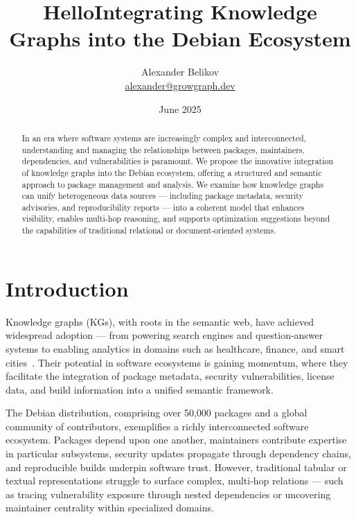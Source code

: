 \documentclass[11pt,oneside,a4paper]{article}
\title{Hello}
\title{Integrating Knowledge Graphs into the Debian Ecosystem}
\author{Alexander Belikov \\ \href{mailto:alexander@growgraph.dev}{alexander@growgraph.dev}}
\date{June 2025}
\begin{document}
    \maketitle

    \begin{abstract}
        In an era where software systems are increasingly complex and interconnected, understanding and managing the relationships between packages, maintainers, dependencies, and vulnerabilities is paramount.
        We propose the innovative integration of knowledge graphs into the Debian ecosystem, offering a structured and semantic approach to package management and analysis.
        We examine how knowledge graphs can unify heterogeneous data sources — including package metadata, security advisories, and reproducibility reports — into a coherent model that enhances visibility, enables multi-hop reasoning, and supports optimization suggestions beyond the capabilities of traditional relational or document‑oriented systems.

    \end{abstract}


    \section{Introduction}
    Knowledge graphs (KGs), with roots in the semantic web, have achieved widespread adoption — from powering search engines and question‑answer systems to enabling analytics in domains such as healthcare, finance, and smart cities~\cite{Iliadis2023-cm}.
    Their potential in software ecosystems is gaining momentum, where they facilitate the integration of package metadata, security vulnerabilities, license data, and build information into a unified semantic framework.

    The Debian distribution, comprising over 50,000 packages and a global community of contributors, exemplifies a richly interconnected software ecosystem.
    Packages depend upon one another, maintainers contribute expertise in particular subsystems, security updates propagate through dependency chains, and reproducible builds underpin software trust.
    However, traditional tabular or textual representations struggle to surface complex, multi‑hop relations — such as tracing vulnerability exposure through nested dependencies or uncovering maintainer centrality within specialized domains.
\end{document}
